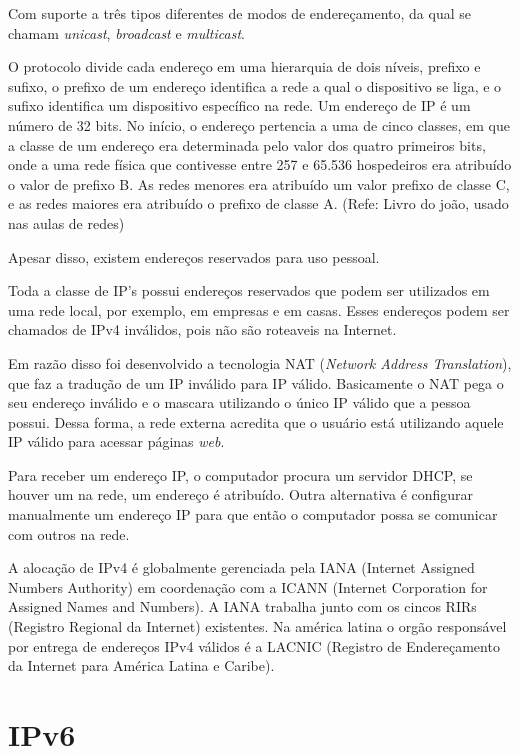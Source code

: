 Com suporte a três tipos diferentes de modos de endereçamento, da qual se chamam \textit{unicast}, \textit{broadcast} e \textit{multicast}.

O protocolo divide cada endereço em uma hierarquia de dois níveis, prefixo e sufixo, o prefixo de um endereço identifica a rede a qual o dispositivo se liga, e o sufixo identifica um dispositivo específico na rede. Um endereço de IP é um número de 32 bits. No início, o endereço pertencia a uma de cinco classes, em que a classe de um endereço era determinada pelo valor dos quatro primeiros bits, onde a uma rede física que contivesse entre 257 e 65.536 hospedeiros era atribuído o valor de prefixo B. As redes menores era atribuído um valor prefixo de classe C, e as redes maiores era atribuído o prefixo de classe A. (Refe: Livro do joão, usado nas aulas de redes)

Apesar disso, existem endereços reservados para uso pessoal.

Toda a classe de IP's possui endereços reservados que podem ser utilizados em uma rede local, por exemplo, em empresas e em casas. Esses endereços podem ser chamados de IPv4 inválidos, pois não são roteaveis na Internet.

Em razão disso foi desenvolvido a tecnologia NAT (\textit{Network Address Translation}), que faz a tradução de um IP inválido para IP válido. Basicamente o NAT  pega o seu endereço inválido e o mascara utilizando o único IP válido que a pessoa possui. Dessa forma, a rede externa acredita que o usuário está utilizando aquele IP válido para acessar páginas \textit{web}.

Para receber um endereço IP, o computador procura um servidor DHCP, se houver um na rede, um endereço é atribuído. Outra alternativa é configurar manualmente um endereço IP para que então o computador possa se comunicar com outros na rede.

A alocação de IPv4 é globalmente gerenciada pela IANA (Internet Assigned Numbers Authority) em coordenação com a ICANN (Internet Corporation for Assigned Names and Numbers). A IANA trabalha junto com os cincos RIRs (Registro Regional da Internet) existentes. Na américa latina o orgão responsável por entrega de endereços IPv4 válidos é a LACNIC (Registro de Endereçamento da Internet para América Latina e Caribe).

\section{IPv6}\label{sec:protIPv6}
